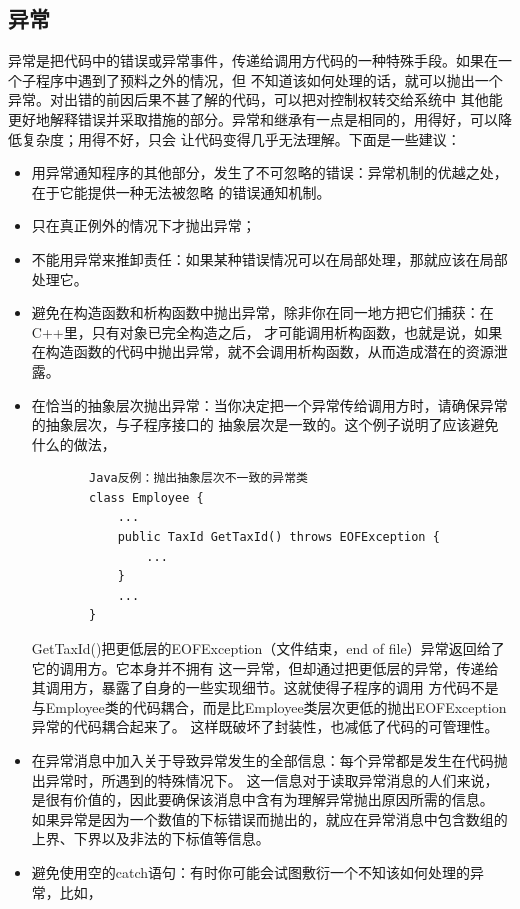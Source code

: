 \documentclass{article}
\begin{document}
\subsection{异常}
异常是把代码中的错误或异常事件，传递给调用方代码的一种特殊手段。如果在一个子程序中遇到了预料之外的情况，但
不知道该如何处理的话，就可以抛出一个异常。对出错的前因后果不甚了解的代码，可以把对控制权转交给系统中
其他能更好地解释错误并采取措施的部分。异常和继承有一点是相同的，用得好，可以降低复杂度；用得不好，只会
让代码变得几乎无法理解。下面是一些建议：
\begin{itemize}
    \item 用异常通知程序的其他部分，发生了不可忽略的错误：异常机制的优越之处，在于它能提供一种无法被忽略
    的错误通知机制。
    \item 只在真正例外的情况下才抛出异常；
    \item 不能用异常来推卸责任：如果某种错误情况可以在局部处理，那就应该在局部处理它。
    \item 避免在构造函数和析构函数中抛出异常，除非你在同一地方把它们捕获：在C++里，只有对象已完全构造之后，
    才可能调用析构函数，也就是说，如果在构造函数的代码中抛出异常，就不会调用析构函数，从而造成潜在的资源泄露。
    \item 在恰当的抽象层次抛出异常：当你决定把一个异常传给调用方时，请确保异常的抽象层次，与子程序接口的
    抽象层次是一致的。这个例子说明了应该避免什么的做法，
    \begin{lstlisting}
        Java反例：抛出抽象层次不一致的异常类
        class Employee {
            ...
            public TaxId GetTaxId() throws EOFException {
                ...
            }
            ...
        }
    \end{lstlisting}
    GetTaxId()把更低层的EOFException（文件结束，end of file）异常返回给了它的调用方。它本身并不拥有
    这一异常，但却通过把更低层的异常，传递给其调用方，暴露了自身的一些实现细节。这就使得子程序的调用
    方代码不是与Employee类的代码耦合，而是比Employee类层次更低的抛出EOFException异常的代码耦合起来了。
    这样既破坏了封装性，也减低了代码的可管理性。
    \item 在异常消息中加入关于导致异常发生的全部信息：每个异常都是发生在代码抛出异常时，所遇到的特殊情况下。
    这一信息对于读取异常消息的人们来说，是很有价值的，因此要确保该消息中含有为理解异常抛出原因所需的信息。
    如果异常是因为一个数值的下标错误而抛出的，就应在异常消息中包含数组的上界、下界以及非法的下标值等信息。
    \item 避免使用空的catch语句：有时你可能会试图敷衍一个不知该如何处理的异常，比如，
    \begin{lstlisting}

\end{lstlisting}
\end{itemize}
\end{document}
